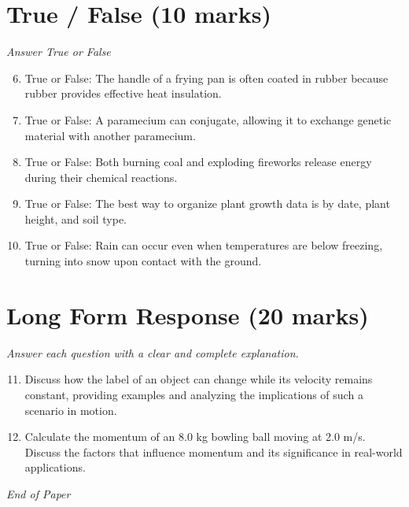 \documentclass[12pt]{article}
\begin{document}
\section*{True / False (10 marks)}
\textit{Answer True or False}
\begin{enumerate}[label=\arabic*.]
\setcounter{enumi}{5}
\item True or False: The handle of a frying pan is often coated in rubber because rubber provides effective heat insulation.
\item True or False: A paramecium can conjugate, allowing it to exchange genetic material with another paramecium.
\item True or False: Both burning coal and exploding fireworks release energy during their chemical reactions.
\item True or False: The best way to organize plant growth data is by date, plant height, and soil type.
\item True or False: Rain can occur even when temperatures are below freezing, turning into snow upon contact with the ground.
\end{enumerate}

\section*{Long Form Response (20 marks)}
\textit{Answer each question with a clear and complete explanation.}
\begin{enumerate}[label=\arabic*.]
\setcounter{enumi}{10}
\item Discuss how the label of an object can change while its velocity remains constant, providing examples and analyzing the implications of such a scenario in motion.
\item Calculate the momentum of an 8.0 kg bowling ball moving at 2.0 m/s. Discuss the factors that influence momentum and its significance in real-world applications.
\end{enumerate}

\vfill
\noindent\textit{End of Paper}
\end{document}
